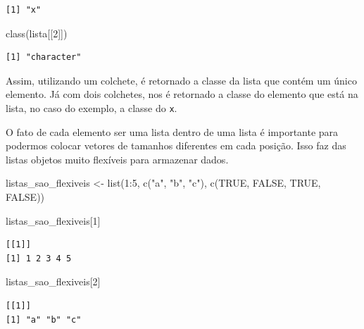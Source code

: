 \documentclass[
  brazilian,
]{book}
\newenvironment{Shaded}{\begin{snugshade}}{\end{snugshade}}
\newcommand{\ConstantTok}[1]{\textcolor[rgb]{0.00,0.00,0.00}{#1}}
\newcommand{\DecValTok}[1]{\textcolor[rgb]{0.00,0.00,0.81}{#1}}
\newcommand{\FunctionTok}[1]{\textcolor[rgb]{0.00,0.00,0.00}{#1}}
\newcommand{\NormalTok}[1]{#1}
\newcommand{\OtherTok}[1]{\textcolor[rgb]{0.56,0.35,0.01}{#1}}
\newcommand{\SpecialCharTok}[1]{\textcolor[rgb]{0.00,0.00,0.00}{#1}}
\newcommand{\StringTok}[1]{\textcolor[rgb]{0.31,0.60,0.02}{#1}}
\begin{document}
\begin{verbatim}
[1] "x"
\end{verbatim}

\begin{Shaded}
\begin{Highlighting}[]
\FunctionTok{class}\NormalTok{(lista[[}\DecValTok{2}\NormalTok{]])}
\end{Highlighting}
\end{Shaded}

\begin{verbatim}
[1] "character"
\end{verbatim}

Assim, utilizando um colchete, é retornado a classe da lista que contém um único elemento. Já com dois colchetes, nos é retornado a classe do elemento que está na lista, no caso do exemplo, a classe do \texttt{x}.

O fato de cada elemento ser uma lista dentro de uma lista é importante para podermos colocar vetores de tamanhos diferentes em cada posição. Isso faz das listas objetos muito flexíveis para armazenar dados.

\begin{Shaded}
\begin{Highlighting}[]
\NormalTok{listas\_sao\_flexiveis }\OtherTok{\textless{}{-}} \FunctionTok{list}\NormalTok{(}\DecValTok{1}\SpecialCharTok{:}\DecValTok{5}\NormalTok{, }\FunctionTok{c}\NormalTok{(}\StringTok{"a"}\NormalTok{, }\StringTok{"b"}\NormalTok{, }\StringTok{"c"}\NormalTok{), }\FunctionTok{c}\NormalTok{(}\ConstantTok{TRUE}\NormalTok{, }\ConstantTok{FALSE}\NormalTok{, }\ConstantTok{TRUE}\NormalTok{, }\ConstantTok{FALSE}\NormalTok{))}

\NormalTok{listas\_sao\_flexiveis[}\DecValTok{1}\NormalTok{]}
\end{Highlighting}
\end{Shaded}

\begin{verbatim}
[[1]]
[1] 1 2 3 4 5
\end{verbatim}

\begin{Shaded}
\begin{Highlighting}[]
\NormalTok{listas\_sao\_flexiveis[}\DecValTok{2}\NormalTok{]}
\end{Highlighting}
\end{Shaded}

\begin{verbatim}
[[1]]
[1] "a" "b" "c"
\end{verbatim}
\end{document}
